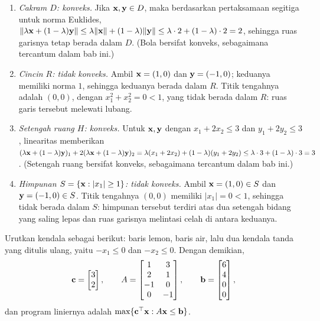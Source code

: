 \begin{enumerate}
\item \emph{Cakram $D$: konveks.} Jika $\mathbf{x}, \mathbf{y} \in D$, maka berdasarkan pertaksamaan segitiga untuk norma Euklides, $\|\lambda \mathbf{x} + (1-\lambda)\mathbf{y}\| \leq \lambda\|\mathbf{x}\| + (1-\lambda)\|\mathbf{y}\| \leq \lambda\cdot 2 + (1-\lambda)\cdot 2 = 2$, sehingga ruas garisnya tetap berada dalam $D$. (Bola bersifat konveks, sebagaimana tercantum dalam bab ini.)
\item \emph{Cincin $R$: tidak konveks.} Ambil $\mathbf{x} = (1, 0)$ dan $\mathbf{y} = (-1, 0)$; keduanya memiliki norma $1$, sehingga keduanya berada dalam $R$. Titik tengahnya adalah $(0,0)$, dengan $x_1^2 + x_2^2 = 0 < 1$, yang tidak berada dalam $R$: ruas garis tersebut melewati lubang.
\item \emph{Setengah ruang $H$: konveks.} Untuk $\mathbf{x}, \mathbf{y}$ dengan $x_1 + 2x_2 \leq 3$ dan $y_1 + 2y_2 \leq 3$, linearitas memberikan $(\lambda \mathbf{x} + (1-\lambda)\mathbf{y})_1 + 2(\lambda \mathbf{x} + (1-\lambda)\mathbf{y})_2 = \lambda(x_1 + 2x_2) + (1-\lambda)(y_1 + 2y_2) \leq \lambda\cdot 3 + (1-\lambda)\cdot 3 = 3$. (Setengah ruang bersifat konveks, sebagaimana tercantum dalam bab ini.)
\item \emph{Himpunan $S = \{\mathbf{x} : |x_1| \geq 1\}$: tidak konveks.} Ambil $\mathbf{x} = (1, 0) \in S$ dan $\mathbf{y} = (-1, 0) \in S$. Titik tengahnya $(0,0)$ memiliki $|x_1| = 0 < 1$, sehingga tidak berada dalam $S$: himpunan tersebut terdiri atas dua setengah bidang yang saling lepas dan ruas garisnya melintasi celah di antara keduanya.
\end{enumerate}

Urutkan kendala sebagai berikut: baris lemon, baris air, lalu dua kendala tanda yang ditulis ulang, yaitu $-x_1 \leq 0$ dan $-x_2 \leq 0$. Dengan demikian,
\[
\mathbf{c} = \begin{bmatrix} 3 \\ 2 \end{bmatrix}, \qquad
A = \begin{bmatrix} 1 & 3 \\ 2 & 1 \\ -1 & 0 \\ 0 & -1 \end{bmatrix}, \qquad
\mathbf{b} = \begin{bmatrix} 6 \\ 4 \\ 0 \\ 0 \end{bmatrix},
\]
dan program liniernya adalah $\max\{ \mathbf{c}^\top \mathbf{x} : A\mathbf{x} \leq \mathbf{b} \}$.

